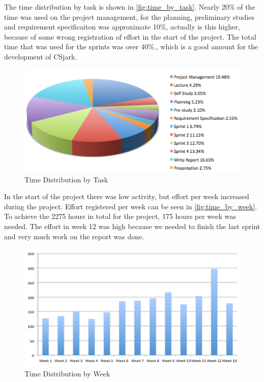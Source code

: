 The time distribution by task is shown in \autoref{fig:time_by_task}. Nearly 
20\% of the time was used on the project management, for the planning, 
preliminary studies and requirement specificaiton was approximate 10\%, 
actually is this higher, because of some wrong registration of effort in the 
start of the project. The total time that was used for the sprints was over 
40\%., which is a good amount for the development of CSjark. 

\begin{figure}[htb]
	\center
	\includegraphics[width=\textwidth]{./evaluation/img/piechart_time}
	\caption{Time Distribution by Task\label{fig:time_by_task}}
\end{figure}

In the start of the project there was low activity, but effort per week 
increased during the project. Effort registered per week can be seen in 
\autoref{fig:time_by_week}. To achieve the 2275 hours in total for the 
project, 175 hours per week was needed. The effort in week 12 was high because 
we needed to finish the last sprint and very much work on the report was done.

\begin{figure}[htb]
	\center
	\includegraphics[width=\textwidth]{./evaluation/img/columnchart_effort} 
	\caption{Time Distribution by Week\label{fig:time_by_week}}
\end{figure}

